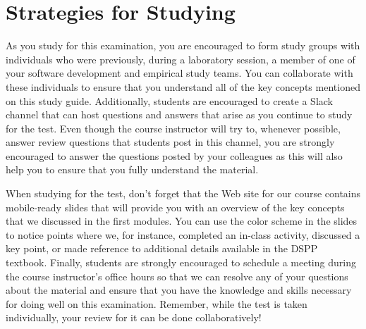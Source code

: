 \vspace*{-.2in}
\section*{Strategies for Studying}
\vspace*{-.1in}

As you study for this examination, you are encouraged to form study groups with individuals who were previously, during
a laboratory session, a member of one of your software development and empirical study teams. You can collaborate with
these individuals to ensure that you understand all of the key concepts mentioned on this study guide. Additionally,
students are encouraged to create a Slack channel that can host questions and answers that arise as you continue to
study for the test.  Even though the course instructor will try to, whenever possible, answer review questions that
students post in this channel, you are strongly encouraged to answer the questions posted by your colleagues as this
will also help you to ensure that you fully understand the material.

When studying for the test, don't forget that the Web site for our course contains mobile-ready slides that will provide
you with an overview of the key concepts that we discussed in the first modules. You can use the color scheme in the
slides to notice points where we, for instance, completed an in-class activity, discussed a key point, or made reference
to additional details available in the DSPP textbook. Finally, students are strongly encouraged to schedule a meeting
during the course instructor's office hours so that we can resolve any of your questions about the material and ensure
that you have the knowledge and skills necessary for doing well on this examination. Remember, while the test is taken
individually, your review for it can be done collaboratively!


